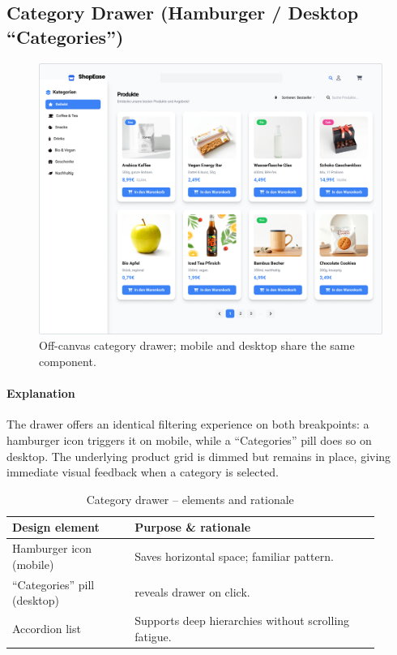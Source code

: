 \documentclass[12pt]{article}
\begin{document}
	\subsection{Category Drawer (Hamburger / Desktop “Categories”)}\label{subsec:category-drawer-(hamburger-/-desktop-categories)}

	\begin{figure}[H]
		\centering
		\includegraphics[width=\linewidth]{pictures/main/categories_Figma}%
		\caption{Off-canvas category drawer; mobile and desktop share the same component.}
		\label{fig:ui-category-drawer}
	\end{figure}

	\paragraph{Explanation}
	The drawer offers an identical filtering experience on both breakpoints:
	a hamburger icon triggers it on mobile, while a “Categories” pill does so on
	desktop.
	The underlying product grid is dimmed but remains in place, giving
	immediate visual feedback when a category is selected.

	\begin{table}[H]
		\centering
		\caption{Category drawer – elements and rationale}
		\label{tab:category-elements}
		\begin{tabular}{p{0.30\linewidth} p{0.60\linewidth}}
			\toprule
			\textbf{Design element} & \textbf{Purpose \& rationale} \\ \midrule

			Hamburger icon (mobile) & Saves horizontal space; familiar pattern. \\
			“Categories” pill (desktop) & reveals drawer on click. \\
			Accordion list          & Supports deep hierarchies without scrolling fatigue. \\

			\bottomrule
		\end{tabular}
	\end{table}
\end{document}
